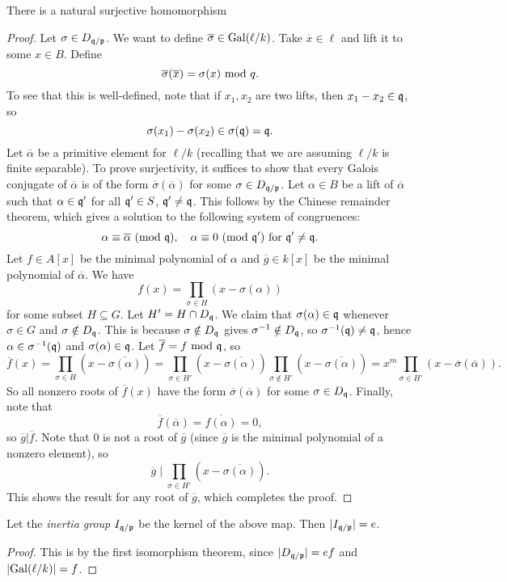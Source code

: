 \begin{theorem}[Frobenius]
  There is a natural surjective homomorphism
  \begin{center}
  \end{center}
\end{theorem}

\begin{proof}
  Let $\sigma \in D_{\mathfrak{q} / \mathfrak{p}}$. We want to define
  $\overline{\sigma} \in \operatorname{Gal}(\ell / k)$. Take
  $\overline{x} \in \ell$ and lift it to some $x \in B$.
  Define
  \[
    \overline{\sigma}(\overline{x}) = \sigma(x) \ {\mathrm{mod}\ q}.
  \]
  To see that this is well-defined, note that if
  $x_1, x_2$ are two lifts, then
  $x_1 - x_2 \in \mathfrak{q}$, so
  \[
    \sigma(x_1) - \sigma(x_2) \in \sigma(\mathfrak{q}) = \mathfrak{q}.
  \]
  Let $\overline{\alpha}$ be a primitive element
  for $\ell / k$ (recalling that we are assuming
  $\ell / k$ is finite separable). To
  prove surjectivity, it suffices to show that every
  Galois conjugate of $\overline{\alpha}$ is of the
  form $\overline{\sigma}(\overline{\alpha})$ for some
  $\sigma \in D_{\mathfrak{q} / \mathfrak{p}}$. Let $\alpha \in B$
  be a lift of $\overline{\alpha}$ such that
  $\alpha \in \mathfrak{q}'$ for all $\mathfrak{q}' \in S$, $\mathfrak{q}' \ne \mathfrak{q}$.
  This follows by the Chinese remainder theorem, which
  gives a solution to the following system of
  congruences:
  \[
    \alpha \equiv \overline{\alpha} \ (\mathrm{mod}\ \mathfrak{q}), \quad
    \alpha \equiv 0 \ (\mathrm{mod}\ \mathfrak{q}') \text{ for } \mathfrak{q}' \ne \mathfrak{q}.
  \]
  Let $f \in A[x]$ be the minimal polynomial of
  $\alpha$ and $\overline{g} \in k[x]$ be the
  minimal polynomial of $\overline{\alpha}$. We have
  \[
    f(x) = \prod_{\sigma \in H} (x - \sigma(\alpha))
  \]
  for some subset $H \subseteq G$. Let
  $H' = H \cap D_{\mathfrak{q}}$. We claim that
  $\sigma(\alpha) \in \mathfrak{q}$ whenever $\sigma \in G$
  and $\sigma \notin D_{\mathfrak{q}}$. This is because
  $\sigma \notin D_{\mathfrak{q}}$ gives $\sigma^{-1} \notin D_{\mathfrak{q}}$,
  so $\sigma^{-1} (\mathfrak{q}) \ne \mathfrak{q}$, hence
  $\alpha \in \sigma^{-1}(\mathfrak{q})$ and
  $\sigma(\alpha) \in \mathfrak{q}$.
  Let $\overline{f} = f \ {\mathrm{mod}\ \mathfrak{q}}$, so
  \[
    \overline{f}(x)
    = \prod_{\sigma \in H} (x - \overline{\sigma(\alpha)})
    = \prod_{\sigma \in H'} (x - \overline{\sigma(\alpha)})
    \prod_{\sigma \notin H'} (x - \overline{\sigma(\alpha)})
    = x^m \prod_{\sigma \in H'} (x - \overline{\sigma}(\overline{\alpha})).
  \]
  So all nonzero roots of $\overline{f}(x)$ have
  the form $\overline{\sigma}(\overline{\alpha})$ for
  some $\sigma \in D_{\mathfrak{q}}$. Finally, note that
  \[
    \overline{f}(\overline{\alpha})
    = \overline{f(\alpha)} = 0,
  \]
  so $\overline{g} | \overline{f}$. Note that $0$ is
  not a root of $\overline{g}$ (since $\overline{g}$
  is the minimal polynomial of a nonzero element), so
  \[
    \overline{g} \mid \prod_{\sigma \in H'} (x - \overline{\sigma(\alpha)}).
  \]
  This shows the result for any root of
  $\overline{g}$, which completes the proof.
\end{proof}

\begin{corollary}
  Let the \emph{inertia group} $I_{\mathfrak{q} / \mathfrak{p}}$ be the
  kernel of the above map. Then $|I_{\mathfrak{q} / \mathfrak{p}}| = e$.
\end{corollary}

\begin{proof}
  This is by the first isomorphism theorem, since
  $|D_{\mathfrak{q} / \mathfrak{p}}| = ef$ and $|{\operatorname{Gal}(\ell / k)}| = f$.
\end{proof}

